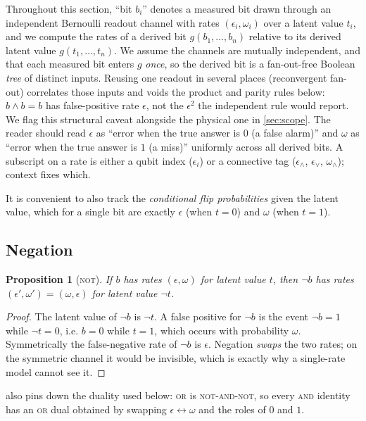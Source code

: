 \documentclass[a4paper,onecolumn,unpublished,nopdfoutputerror,allowtoday]{quantumarticle}
\numberwithin{equation}{section}
\theoremstyle{plain}
\newtheorem{proposition}[theorem]{Proposition}
\theoremstyle{definition}
\theoremstyle{remark}
\newcommand{\eps}{\epsilon}
\begin{document}
Throughout this section, ``bit $b_i$'' denotes a measured bit drawn through an
independent Bernoulli readout channel with rates $(\eps_i,\omega_i)$ over a
latent value $t_i$, and we compute the rates of a derived bit
$g(b_1,\dots,b_n)$ relative to its derived latent value $g(t_1,\dots,t_n)$. We
assume the channels are mutually independent, and that each measured bit enters
$g$ \emph{once}, so the derived bit is a fan-out-free Boolean \emph{tree} of
distinct inputs. Reusing one readout in several places (reconvergent fan-out)
correlates those inputs and voids the product and parity rules below: $b\wedge b
= b$ has false-positive rate $\eps$, not the $\eps^2$ the independent rule would
report. We flag this structural caveat alongside the physical one in
\cref{sec:scope}. The reader should read $\eps$ as
``error when the true answer is $0$ (a false alarm)'' and $\omega$ as ``error
when the true answer is $1$ (a miss)'' uniformly across all derived bits. A
subscript on a rate is either a qubit index ($\eps_i$) or a connective tag
($\eps_\wedge$, $\eps_\vee$, $\omega_\wedge$); context fixes which.

It is convenient to also track the \emph{conditional flip probabilities} given
the latent value, which for a single bit are exactly $\eps$ (when $t=0$) and
$\omega$ (when $t=1$).

\subsection{Negation}

\begin{proposition}[\textsc{not}]
\label{prop:not}
If $b$ has rates $(\eps,\omega)$ for latent value $t$, then $\lnot b$ has rates
$(\eps',\omega')=(\omega,\eps)$ for latent value $\lnot t$.
\end{proposition}

\begin{proof}
The latent value of $\lnot b$ is $\lnot t$. A false positive for $\lnot b$ is the
event $\lnot b=1$ while $\lnot t=0$, i.e. $b=0$ while $t=1$, which occurs with
probability $\omega$. Symmetrically the false-negative rate of $\lnot b$ is
$\eps$. Negation \emph{swaps} the two rates; on the symmetric channel it would be
invisible, which is exactly why a single-rate model cannot see it.
\end{proof}

 also pins down the duality used below: \textsc{or} is
\textsc{not}-\textsc{and}-\textsc{not}, so every \textsc{and} identity has an
\textsc{or} dual obtained by swapping $\eps\leftrightarrow\omega$ and the roles
of $0$ and $1$.
\end{document}
